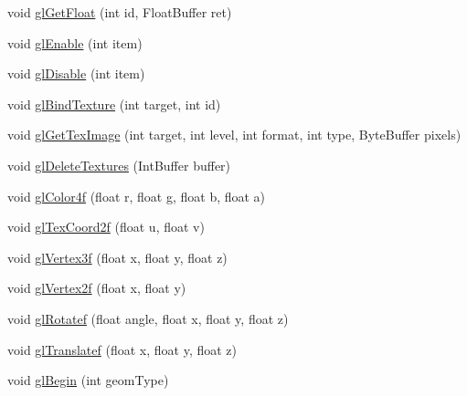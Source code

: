 \begin{DoxyCompactItemize}
void \mbox{\hyperlink{interfaceorg_1_1newdawn_1_1slick_1_1opengl_1_1renderer_1_1_s_g_l_aa9013a2eb8ec3fa76714ed1cfcb6f5bf}{gl\+Get\+Float}} (int id, Float\+Buffer ret)
\item 
void \mbox{\hyperlink{interfaceorg_1_1newdawn_1_1slick_1_1opengl_1_1renderer_1_1_s_g_l_a35991f93081980b303d6ccc5bd88c8da}{gl\+Enable}} (int item)
\item 
void \mbox{\hyperlink{interfaceorg_1_1newdawn_1_1slick_1_1opengl_1_1renderer_1_1_s_g_l_a3b47b402f84bc1404e6b218264981bb5}{gl\+Disable}} (int item)
\item 
void \mbox{\hyperlink{interfaceorg_1_1newdawn_1_1slick_1_1opengl_1_1renderer_1_1_s_g_l_a7b546bba69c511f7d96d055ac1ed6a21}{gl\+Bind\+Texture}} (int target, int id)
\item 
void \mbox{\hyperlink{interfaceorg_1_1newdawn_1_1slick_1_1opengl_1_1renderer_1_1_s_g_l_a2df0054d4c79f4f9d854a7b55975ecc0}{gl\+Get\+Tex\+Image}} (int target, int level, int format, int type, Byte\+Buffer pixels)
\item 
void \mbox{\hyperlink{interfaceorg_1_1newdawn_1_1slick_1_1opengl_1_1renderer_1_1_s_g_l_a763a5728906baa94182a81ed3bb52ca0}{gl\+Delete\+Textures}} (Int\+Buffer buffer)
\item 
void \mbox{\hyperlink{interfaceorg_1_1newdawn_1_1slick_1_1opengl_1_1renderer_1_1_s_g_l_a0dab1e4788ac76db632800701d9b959d}{gl\+Color4f}} (float r, float g, float b, float a)
\item 
void \mbox{\hyperlink{interfaceorg_1_1newdawn_1_1slick_1_1opengl_1_1renderer_1_1_s_g_l_a5f661318cf9926c586a9837d0ded9fbd}{gl\+Tex\+Coord2f}} (float u, float v)
\item 
void \mbox{\hyperlink{interfaceorg_1_1newdawn_1_1slick_1_1opengl_1_1renderer_1_1_s_g_l_ae2baba1598d723f9059f45e0871be822}{gl\+Vertex3f}} (float x, float y, float z)
\item 
void \mbox{\hyperlink{interfaceorg_1_1newdawn_1_1slick_1_1opengl_1_1renderer_1_1_s_g_l_ad9c89f8bb275f22956f7687da5ec27c5}{gl\+Vertex2f}} (float x, float y)
\item 
void \mbox{\hyperlink{interfaceorg_1_1newdawn_1_1slick_1_1opengl_1_1renderer_1_1_s_g_l_ac5675bd1b391998a8bf63d5d87a04347}{gl\+Rotatef}} (float angle, float x, float y, float z)
\item 
void \mbox{\hyperlink{interfaceorg_1_1newdawn_1_1slick_1_1opengl_1_1renderer_1_1_s_g_l_a647aff6cabd0c83869166144e9aee833}{gl\+Translatef}} (float x, float y, float z)
\item 
void \mbox{\hyperlink{interfaceorg_1_1newdawn_1_1slick_1_1opengl_1_1renderer_1_1_s_g_l_a34ef78aa5f8f5774c06117a01932fb02}{gl\+Begin}} (int geom\+Type)

\end{DoxyCompactItemize}
